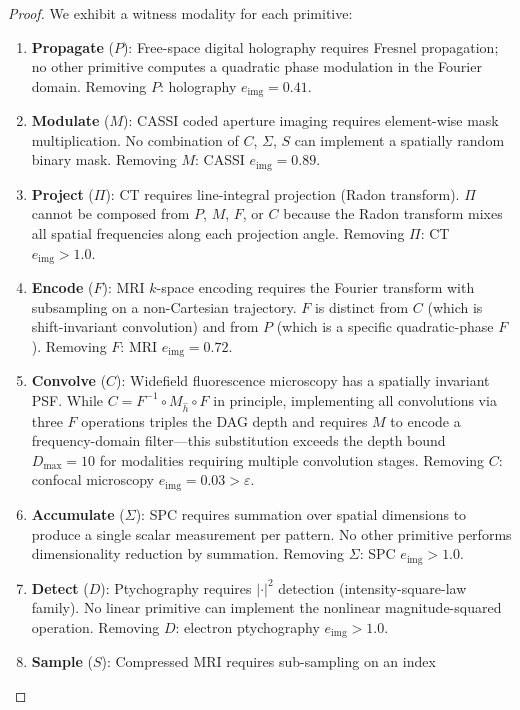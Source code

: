 \documentclass[11pt]{article}
\theoremstyle{definition}
\begin{document}
\begin{proof}
We exhibit a witness modality for each primitive:

\begin{enumerate}
  \item \textbf{Propagate} ($P$): Free-space digital holography requires Fresnel propagation;
    no other primitive computes a quadratic phase modulation in the Fourier domain.
    Removing $P$: holography $e_{\mathrm{img}} = 0.41$.
  \item \textbf{Modulate} ($M$): CASSI coded aperture imaging requires
    element-wise mask multiplication. No combination of $C$, $\Sigma$, $S$
    can implement a spatially random binary mask.
    Removing $M$: CASSI $e_{\mathrm{img}} = 0.89$.
  \item \textbf{Project} ($\Pi$): CT requires line-integral projection (Radon transform).
    $\Pi$ cannot be composed from $P$, $M$, $F$, or $C$ because the Radon
    transform mixes all spatial frequencies along each projection angle.
    Removing $\Pi$: CT $e_{\mathrm{img}} > 1.0$.
  \item \textbf{Encode} ($F$): MRI $k$-space encoding requires the Fourier transform
    with subsampling on a non-Cartesian trajectory.
    $F$ is distinct from $C$ (which is shift-invariant convolution)
    and from $P$ (which is a specific quadratic-phase $F$).
    Removing $F$: MRI $e_{\mathrm{img}} = 0.72$.
  \item \textbf{Convolve} ($C$): Widefield fluorescence microscopy has a
    spatially invariant PSF.  While $C = F^{-1} \circ M_{\hat{h}} \circ F$
    in principle, implementing all convolutions via three $F$ operations
    triples the DAG depth and requires $M$ to encode a frequency-domain
    filter---this substitution exceeds the depth bound $D_{\max} = 10$
    for modalities requiring multiple convolution stages.
    Removing $C$: confocal microscopy $e_{\mathrm{img}} = 0.03 > \varepsilon$.
  \item \textbf{Accumulate} ($\Sigma$): SPC requires summation over spatial
    dimensions to produce a single scalar measurement per pattern.
    No other primitive performs dimensionality reduction by summation.
    Removing $\Sigma$: SPC $e_{\mathrm{img}} > 1.0$.
  \item \textbf{Detect} ($D$): Ptychography requires $|{\cdot}|^2$ detection
    (intensity-square-law family).  No linear primitive can implement
    the nonlinear magnitude-squared operation.
    Removing $D$: electron ptychography $e_{\mathrm{img}} > 1.0$.
  \item \textbf{Sample} ($S$): Compressed MRI requires sub-sampling on an index

\end{enumerate}
\end{proof}
\end{document}
